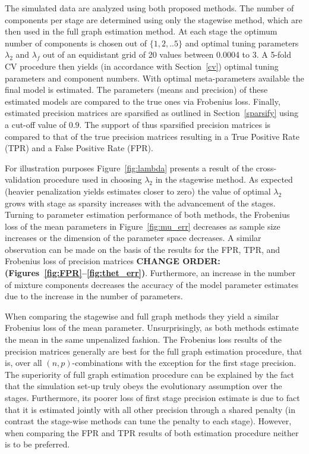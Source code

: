 \documentclass[10pt]{article}
\begin{document}
The simulated data are analyzed using both proposed methods. The number of components per stage are determined using only the stagewise method, which are then used in the full graph estimation method. At each stage the optimum number of components is chosen out of $\{1,2,..5\}$ and optimal tuning parameters $\lambda_2$ and $\lambda_f$ out of an equidistant grid of 20 values between 0.0004 to 3. A 5-fold CV procedure then yields (in accordance with Section~\ref{cv}) optimal tuning parameters and component numbers. With optimal meta-parameters available the final model is estimated. The parameters (means and precision) of these estimated models are compared to the true ones via Frobenius loss. Finally, estimated precision matrices are sparsified as outlined in Section~\ref{sparsify} using a cut-off value of $0.9$. The support of thus sparsified precision matrices is compared to that of the true precision matrices resulting in a True Positive Rate (TPR) and a False Positive Rate (FPR).

For illustration purposes Figure~\ref{fig:lambda} presents a result of the cross-validation procedure used  in choosing $\lambda_2$ in the stagewise method. As expected (heavier penalization yields estimates closer to zero) the value of optimal $\lambda_2$ grows with stage as sparsity increases with the advancement of the stages. Turning to parameter estimation performance of both methods, the Frobenius loss of the mean parameters in Figure~\ref{fig:mu_err} decreases as sample size increases or the dimension of the parameter space decreases. A similar observation can be made on the basis of the results for the FPR, TPR, and Frobenius loss of precision matrices \textbf{CHANGE ORDER: (Figures~\ref{fig:FPR}--\ref{fig:thet_err})}. Furthermore, an increase in the number of mixture components decreases the accuracy of the model parameter estimates due to the increase in the number of parameters.


When comparing the stagewise and full graph methods they yield a similar Frobenius loss of the mean parameter. Unsurprisingly, as both methods estimate the mean in the same unpenalized fashion. The Frobenius loss results of the precision matrices generally are best for the full graph estimation procedure, that is, over all $(n, p)$-combinations with the exception for the first stage precision. The superiority of full graph estimation procedure can be explained by the fact that the simulation set-up truly obeys the evolutionary assumption over the stages. Furthermore, its poorer loss of first stage precision estimate is due to fact that it is estimated jointly with all other precision through a shared penalty (in contrast the stage-wise methods can tune the penalty to each stage). However, when comparing the FPR and TPR results of both estimation procedure neither is to be preferred.
\end{document}
